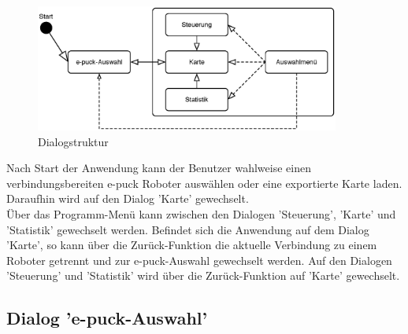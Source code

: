 \documentclass[10pt,a4paper]{article}
\begin{document}
			\begin{figure}[h]
				\centering
				\includegraphics[width=10cm]{images/dialog.eps}
  				\caption{Dialogstruktur}
  			\end{figure}
  			
  			Nach Start der Anwendung kann der Benutzer wahlweise einen verbindungsbereiten e-puck Roboter auswählen oder eine
  			exportierte Karte laden. Daraufhin wird auf den Dialog 'Karte' gewechselt. \\
  			Über das Programm-Menü kann zwischen den Dialogen 'Steuerung', 'Karte' und 'Statistik' gewechselt werden. Befindet sich die
  			Anwendung auf dem Dialog 'Karte', so kann über die Zurück-Funktion die aktuelle Verbindung zu einem Roboter getrennt
  			und zur  e-puck-Auswahl gewechselt werden. Auf den Dialogen 'Steuerung' und 'Statistik' wird über die Zurück-Funktion
  			auf 'Karte' gewechselt.
  			
  			\subsection{Dialog 'e-puck-Auswahl'}
  			
\end{document}

